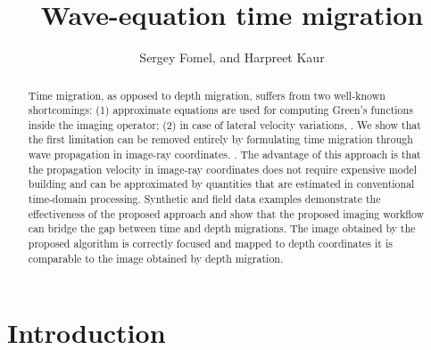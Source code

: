 \documentclass[manuscript]{geophysics}
\begin{document}
\title{Wave-equation time migration}
\author{Sergey Fomel, and Harpreet Kaur}



\maketitle

\begin{abstract}
  Time migration, as opposed to depth migration,
  suffers from two well-known shortcomings: (1) approximate equations
  are used for computing Green's functions inside the imaging
  operator; (2) in case of lateral velocity variations, . We show that the first
  limitation can be removed entirely by formulating time migration
  through wave propagation in image-ray coordinates. . The advantage of
  this approach is that the propagation velocity in image-ray
  coordinates does not require expensive model building and can be
  approximated by quantities that are estimated in conventional
  time-domain processing. Synthetic and field data examples demonstrate the effectiveness of the proposed approach and show that the proposed imaging workflow 
  can bridge the gap between time and depth migrations. The image obtained by the proposed algorithm is
correctly focused and mapped to depth coordinates it is comparable to the image obtained by depth migration. 
\end{abstract}

\section{Introduction}
\end{document}
